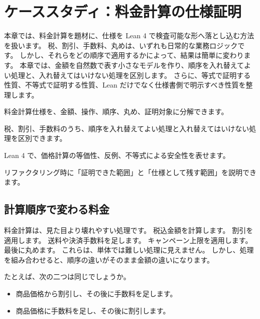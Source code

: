 \chapter{ケーススタディ：料金計算の仕様証明}
\label{chap:ch26_price_spec}

\begin{chapterabstract}
本章では、料金計算を題材に、仕様を Lean 4 で検査可能な形へ落とし込む方法を扱います。
税、割引、手数料、丸めは、いずれも日常的な業務ロジックです。
しかし、それらをどの順序で適用するかによって、結果は簡単に変わります。
本章では、金額を自然数で表す小さなモデルを作り、順序を入れ替えてよい処理と、入れ替えてはいけない処理を区別します。
さらに、等式で証明する性質、不等式で証明する性質、Lean だけでなく仕様書側で明示すべき性質を整理します。
\end{chapterabstract}

\begin{learninggoals}
\item 料金計算仕様を、金額、操作、順序、丸め、証明対象に分解できます。
\item 税、割引、手数料のうち、順序を入れ替えてよい処理と入れ替えてはいけない処理を区別できます。
\item Lean 4 で、価格計算の等価性、反例、不等式による安全性を表せます。
\item リファクタリング時に「証明できた範囲」と「仕様として残す範囲」を説明できます。
\end{learninggoals}

\section{計算順序で変わる料金}

料金計算は、見た目より壊れやすい処理です。
税込金額を計算します。
割引を適用します。
送料や決済手数料を足します。
キャンペーン上限を適用します。
最後に丸めます。
これらは、単体では難しい処理に見えません。
しかし、処理を組み合わせると、順序の違いがそのまま金額の違いになります。

たとえば、次の二つは同じでしょうか。

\begin{itemize}
\item 商品価格から割引し、その後に手数料を足します。
\item 商品価格に手数料を足し、その後に割引します。
\end{itemize}


